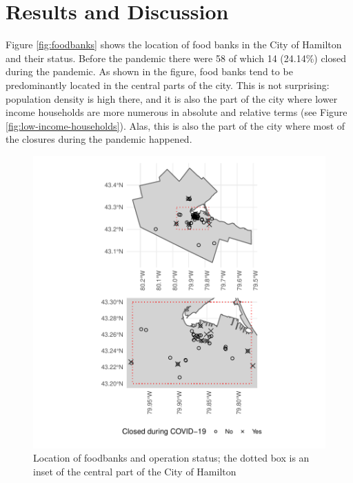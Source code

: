 \documentclass[]{elsarticle} %
\begin{document}
\hypertarget{results-and-discussion}{%
\section{Results and Discussion}\label{results-and-discussion}}

Figure \ref{fig:foodbanks} shows the location of food banks in the City
of Hamilton and their status. Before the pandemic there were 58 of which
14 (24.14\%) closed during the pandemic. As shown in the figure, food
banks tend to be predominantly located in the central parts of the city.
This is not surprising: population density is high there, and it is also
the part of the city where lower income households are more numerous in
absolute and relative terms (see Figure
\ref{fig:low-income-households}). Alas, this is also the part of the
city where most of the closures during the pandemic happened.

\begin{figure}
\includegraphics[width=1\linewidth]{Accessibility-Foodbanks-Hamilton_files/figure-latex/plot-location-foodbanks-1} \caption{\label{fig:foodbanks}Location of foodbanks and operation status; the dotted box is an inset of the central part of the City of Hamilton}\label{fig:plot-location-foodbanks}
\end{figure}
\end{document}
